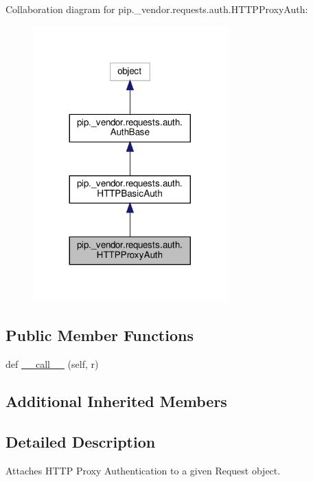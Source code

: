 Collaboration diagram for pip.\+\_\+vendor.\+requests.\+auth.\+H\+T\+T\+P\+Proxy\+Auth\+:
\nopagebreak
\begin{figure}[H]
\begin{center}
\leavevmode
\includegraphics[width=212pt]{classpip_1_1__vendor_1_1requests_1_1auth_1_1HTTPProxyAuth__coll__graph}
\end{center}
\end{figure}
\subsection*{Public Member Functions}
\begin{DoxyCompactItemize}
\item 
def \hyperlink{classpip_1_1__vendor_1_1requests_1_1auth_1_1HTTPProxyAuth_a35d052d42e2ea248a50cb017bae48c4f}{\+\_\+\+\_\+call\+\_\+\+\_\+} (self, r)
\end{DoxyCompactItemize}
\subsection*{Additional Inherited Members}


\subsection{Detailed Description}
\begin{DoxyVerb}Attaches HTTP Proxy Authentication to a given Request object.\end{DoxyVerb}
 

